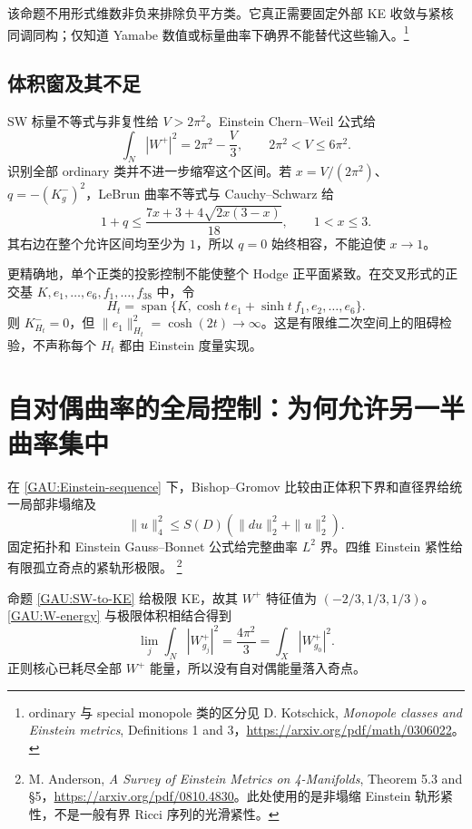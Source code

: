 \documentclass[UTF8,fontset=fandol,zihao=-4,oneside,openany]{ctexbook}
\theoremstyle{cjkplain}
\numberwithin{equation}{chapter}
\begin{document}
该命题不用形式维数非负来排除负平方类。它真正需要固定外部 KE 收敛与紧核同调同构；仅知道 Yamabe 数值或标量曲率下确界不能替代这些输入。\footnote{ordinary 与 special monopole 类的区分见 D. Kotschick, \emph{Monopole classes and Einstein metrics}, Definitions 1 and 3，\url{https://arxiv.org/pdf/math/0306022}。}

\subsection{体积窗及其不足}
SW 标量不等式与非复性给 $V>2\pi^2$。Einstein Chern--Weil 公式给
\begin{equation}\label{GAU:W-energy}
\int_N|W^+|^2=2\pi^2-\frac V3,
\qquad 2\pi^2<V\le6\pi^2.
\end{equation}
识别全部 ordinary 类并不进一步缩窄这个区间。若 $x=V/(2\pi^2)$、$q=-(K_g^-)^2$，LeBrun 曲率不等式与 Cauchy--Schwarz 给
\begin{equation}\label{GAU:Hodge-window}
1+q\le\frac{7x+3+4\sqrt{2x(3-x)}}{18},\qquad1<x\le3.
\end{equation}
其右边在整个允许区间均至少为 $1$，所以 $q=0$ 始终相容，不能迫使 $x\to1$。

更精确地，单个正类的投影控制不能使整个 Hodge 正平面紧致。在交叉形式的正交基 $K,e_1,\ldots,e_6,f_1,\ldots,f_{38}$ 中，令
\[
H_t=\operatorname{span}\{K,\cosh t\,e_1+\sinh t\,f_1,e_2,\ldots,e_6\}.
\]
则 $K^-_{H_t}=0$，但 $\|e_1\|_{H_t}^2=\cosh(2t)\to\infty$。这是有限维二次空间上的阻碍检验，不声称每个 $H_t$ 都由 Einstein 度量实现。

\section{自对偶曲率的全局控制：为何允许另一半曲率集中}
\label{GAU:Weyl}

在 \eqref{GAU:Einstein-sequence} 下，Bishop--Gromov 比较由正体积下界和直径界给统一局部非塌缩及
\begin{equation}\label{GAU:Sobolev}
\|u\|_4^2\le S(D)(\|du\|_2^2+\|u\|_2^2).
\end{equation}
固定拓扑和 Einstein Gauss--Bonnet 公式给完整曲率 $L^2$ 界。四维 Einstein 紧性给有限孤立奇点的紧轨形极限。
\footnote{M. Anderson, \emph{A Survey of Einstein Metrics on 4-Manifolds}, Theorem 5.3 and §5，\url{https://arxiv.org/pdf/0810.4830}。此处使用的是非塌缩 Einstein 轨形紧性，不是一般有界 Ricci 序列的光滑紧性。}

命题 \ref{GAU:SW-to-KE} 给极限 KE，故其 $W^+$ 特征值为 $(-2/3,1/3,1/3)$。\eqref{GAU:W-energy} 与极限体积相结合得到
\[
\lim_j\int_N|W^+_{g_j}|^2=\frac{4\pi^2}{3}
=\int_X|W^+_{g_0}|^2.
\]
正则核心已耗尽全部 $W^+$ 能量，所以没有自对偶能量落入奇点。
\end{document}
